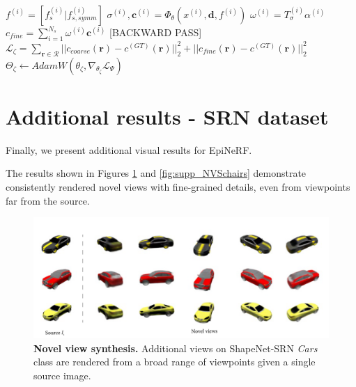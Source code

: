 \begin{algorithm}[htbp]
{{        $f^{(i)} = [f_{s}^{(i)} | f_{s,symm}^{(i)}]$
        $\sigma^{(i)},\mathbf{c}^{(i)} = \Phi_{\theta}(x^{(i)},\mathbf{d},f^{(i)})$ 
        $\omega^{(i)} = T_{\sigma}^{(i)}\alpha^{(i)}$ 
        }
        $c_{fine} = \sum_{i=1}^{N_{s}}\omega^{(i)}\textbf{c}^{(i)}$ 
  \;
  \textcolor{red!50}{[BACKWARD PASS]}\;
    $\mathcal{L}_{\zeta}= \sum_{\mathbf{r}\in\mathcal{R}} || c_{coarse}(\mathbf{r}) - c^{(GT)}(\mathbf{r}) ||_{2}^{2} +|| c_{fine}(\mathbf{r}) - c^{(GT)}(\mathbf{r}) ||_{2}^{2}$
    $\Theta_{\zeta} \gets AdamW(\theta_{\zeta},\nabla_{\theta_{\zeta}} \mathcal{L}_{\Psi})$ 
    }
\end{algorithm}


\section{Additional results - SRN dataset }
\label{appendix:moreres-epinerf}
Finally, we present additional visual results for EpiNeRF.

The results shown in Figures \ref{fig:supp_NVScars} and \ref{fig:supp_NVSchairs} demonstrate consistently rendered novel views with fine-grained details, even from viewpoints far from the source. 

\begin{figure}[htp!]
   \begin{center}
  \includegraphics[width=\linewidth]{images/epinerf/supp_NVS_Cars.png}
  \caption{\textbf{Novel view synthesis.} Additional views on ShapeNet-SRN \textit{Cars} class are rendered from a broad range of viewpoints given a single source image. }
  \label{fig:supp_NVScars}
  \end{center}
\end{figure}


